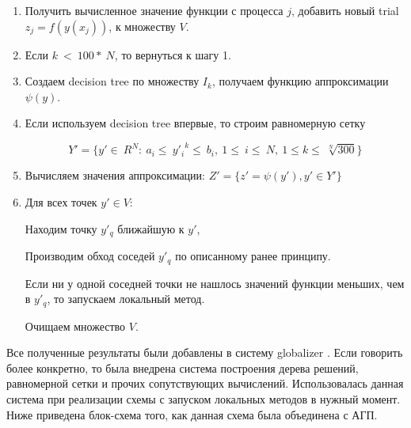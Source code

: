 \documentclass[12pt, a4paper, russian]{article}
\begin{document}
\begin{enumerate}
	\item  Получить вычисленное  значение функции с процесса $j$, добавить новый trial $z_j = f(y(x_j))$, к множеству $V$. 



	\item 	Если $ k\ <\ 100\ast\ N$, то вернуться к шагу 1.


	\item Создаем decision tree по множеству $I_k$, получаем функцию аппроксимации  $\psi(y)$.



	\item 	Если используем decision tree впервые, то строим равномерную сетку

	\begin{displaymath}
	Y'=\{ y'\in\ R^N:\ a_i\le\  {y'_i}^k \le\ b_i,\ 1\le\ i\le\ N,\ 1\le k\le\ \sqrt[N]{300}  \}
	\end{displaymath}

	\item 	Вычисляем значения аппроксимации: $Z' = \{ z'=  \psi(y'), y' \in Y'\}$

	\item Для всех точек $y'\in V$:

	Находим точку $y'_q$ ближайшую  к $y'$,

	Производим обход соседей $y'_q$ по описанному ранее принципу.

	Если ни у одной соседней точки не нашлось значений функции меньших, чем в $y'_q$, то запускаем локальный метод.

	Очищаем множество $V$.


\end{enumerate}



Все полученные результаты были добавлены в систему globalizer \cite{fio_bib18}.
Если говорить более конкретно, то была внедрена система  построения дерева решений, равномерной сетки и прочих сопутствующих вычислений. Использовалась данная система при реализации схемы с запуском локальных методов в нужный момент.  
Ниже приведена блок-схема того, как данная схема была объединена с АГП.
\end{document}
